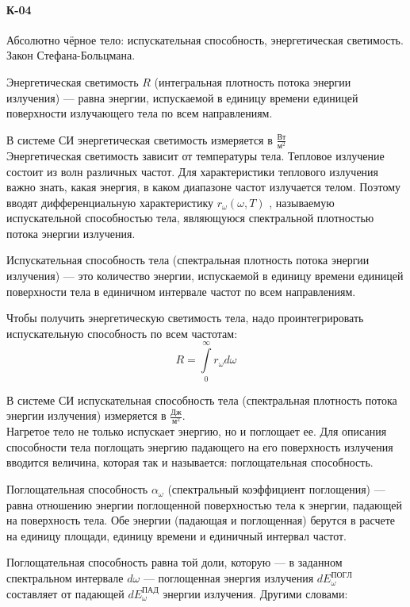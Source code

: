 \documentclass[__main__.tex]{subfiles}
\begin{document}
	\paragraph{К-04}
Абсолютно чёрное тело: испускательная способность, энергетическая светимость. Закон Стефана-Больцмана.\\

\begin{definition}
	Энергетическая светимость $R$ (интегральная плотность потока энергии излучения) — равна энергии, испускаемой в единицу времени единицей поверхности излучающего тела по всем направлениям.
\end{definition}


В системе СИ энергетическая светимость измеряется в $\frac{Вт}{м^2}$\\

Энергетическая светимость зависит от температуры тела. Тепловое излучение состоит из волн различных частот. Для характеристики теплового излучения важно знать, какая энергия, в каком диапазоне частот излучается телом. Поэтому вводят дифференциальную характеристику $r_ω(ω,T)$  , называемую испускательной способностью тела, являющуюся  спектральной плотностью потока энергии излучения.\\

\begin{definition}
	Испускательная способность тела (спектральная плотность потока энергии излучения) — это количество энергии, испускаемой в единицу времени единицей поверхности тела в единичном интервале частот по всем направлениям.
\end{definition}   
Чтобы получить энергетическую светимость тела, надо проинтегрировать испускательную способность по всем частотам:
$$R = \int\limits_{0}^{\infty} r_ω dω$$

В системе СИ испускательная способность тела (спектральная плотность потока энергии излучения) измеряется в $\frac{Дж}{м^2}$.\\

Нагретое тело не только испускает энергию, но и поглощает ее. Для описания способности тела поглощать энергию падающего на его поверхность излучения вводится величина, которая так и называется: поглощательная способность.\\
\begin{definition}
	Поглощательная способность $α_ω$  (спектральный коэффициент поглощения) — равна отношению энергии поглощенной поверхностью тела к энергии, падающей на поверхность тела. Обе энергии (падающая и поглощенная) берутся в расчете на единицу площади, единицу времени и единичный интервал частот.
\end{definition}
Поглощательная способность равна той доли, которую — в заданном спектральном интервале $dω$  — поглощенная энергия излучения $dE_ω^{ПОГЛ}$  составляет от падающей $dE_ω^{ПАД}$ энергии излучения. Другими словами:
\end{document}

